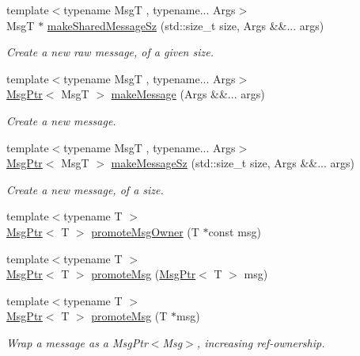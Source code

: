 \begin{DoxyCompactItemize}
{\footnotesize template$<$typename MsgT , typename... Args$>$ }\\MsgT $\ast$ \hyperlink{namespacevt_a1cad9543b26045826f0fa5d17a2dfd2f}{make\+Shared\+Message\+Sz} (std\+::size\+\_\+t size, Args \&\&... args)
\begin{DoxyCompactList}\small\item\em Create a new \textquotesingle{}raw\textquotesingle{} message, of a given size. \end{DoxyCompactList}\item 
{\footnotesize template$<$typename MsgT , typename... Args$>$ }\\\hyperlink{namespacevt_a9f5ebd62ee9d6dd8829e3e1cc4f858e9}{Msg\+Ptr}$<$ MsgT $>$ \hyperlink{namespacevt_a948c0bbe39c34326b5453065a461ebaa}{make\+Message} (Args \&\&... args)
\begin{DoxyCompactList}\small\item\em Create a new message. \end{DoxyCompactList}\item 
{\footnotesize template$<$typename MsgT , typename... Args$>$ }\\\hyperlink{namespacevt_a9f5ebd62ee9d6dd8829e3e1cc4f858e9}{Msg\+Ptr}$<$ MsgT $>$ \hyperlink{namespacevt_a02d4a45f1b229ac6fd5da4bf289d6654}{make\+Message\+Sz} (std\+::size\+\_\+t size, Args \&\&... args)
\begin{DoxyCompactList}\small\item\em Create a new message, of a size. \end{DoxyCompactList}\item 
{\footnotesize template$<$typename T $>$ }\\\hyperlink{namespacevt_a9f5ebd62ee9d6dd8829e3e1cc4f858e9}{Msg\+Ptr}$<$ T $>$ \hyperlink{namespacevt_a67418c428a6a98bdc05c264ef8517dd4}{promote\+Msg\+Owner} (T $\ast$const msg)
\item 
{\footnotesize template$<$typename T $>$ }\\\hyperlink{namespacevt_a9f5ebd62ee9d6dd8829e3e1cc4f858e9}{Msg\+Ptr}$<$ T $>$ \hyperlink{namespacevt_af00ebdeb74801e5658cf5726193d5753}{promote\+Msg} (\hyperlink{namespacevt_a9f5ebd62ee9d6dd8829e3e1cc4f858e9}{Msg\+Ptr}$<$ T $>$ msg)
\item 
{\footnotesize template$<$typename T $>$ }\\\hyperlink{namespacevt_a9f5ebd62ee9d6dd8829e3e1cc4f858e9}{Msg\+Ptr}$<$ T $>$ \hyperlink{namespacevt_a991383de8a150393ef67012fbe689dd0}{promote\+Msg} (T $\ast$msg)
\begin{DoxyCompactList}\small\item\em Wrap a message as a Msg\+Ptr$<$\+Msg$>$, increasing ref-\/ownership. \end{DoxyCompactList}\item 

\end{DoxyCompactItemize}
